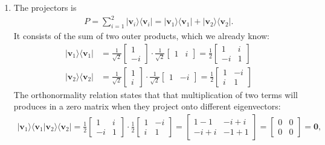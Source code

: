 \documentclass[letterpaper,11pt,twoside]{article}
\newcommand{\ket}[1]{|#1\rangle}
\newcommand{\bra}[1]{\langle#1|}
\newcommand{\braket}[1]{\langle#1\rangle}
\begin{document}
\begin{enumerate}[itemsep=0pt,topsep=0pt,label=\alph*.]
  \item The projectors is 
  \begin{align*}
    P=\sum_{i=1}^2\ket{\bm{v}_i}\bra{\bm{v}_i}=\ket{\bm{v}_1}\bra{\bm{v}_1}+\ket{\bm{v}_2}\bra{\bm{v}_2}.
  \end{align*}
  It consists of the sum of two outer products, which we already know:
  \begin{align*}
    \ket{\bm{v}_1}\bra{\bm{v}_1}&=\frac{1}{\sqrt{2}}\begin{bmatrix}
    1\\-i
    \end{bmatrix}\cdot\frac{1}{\sqrt{2}}\begin{bmatrix}
    1&i
    \end{bmatrix}=\frac{1}{2}\begin{bmatrix}
      1&i\\-i&1
    \end{bmatrix}\\
    \ket{\bm{v}_2}\bra{\bm{v}_2}&=\frac{1}{\sqrt{2}}\begin{bmatrix}
    1\\i
    \end{bmatrix}\cdot\frac{1}{\sqrt{2}}\begin{bmatrix}
    1&-i
    \end{bmatrix}=\frac{1}{2}\begin{bmatrix}
      1&-i\\i&1
    \end{bmatrix}
  \end{align*}
  The orthonormality relation states that that multiplication of two terms will produces in a zero matrix when they project onto 
  different eigenvectors:
  \begin{align*}
    \ket{\bm{v}_1}\braket{\bm{v}_1|\bm{v}_2}\bra{\bm{v}_2}=\frac{1}{2}\begin{bmatrix}
      1&i\\-i&1
    \end{bmatrix}\cdot\frac{1}{2}\begin{bmatrix}
      1&-i\\i&1
    \end{bmatrix}=\begin{bmatrix}
      1-1&-i+i\\-i+i&-1+1
    \end{bmatrix}=\begin{bmatrix}
      0&0\\0&0
    \end{bmatrix}=\bm{0},
  \end{align*}

\end{enumerate}
\end{document}
